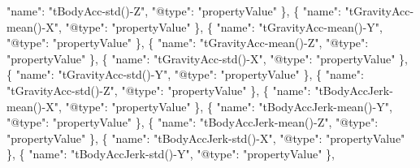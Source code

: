 \documentclass[
]{article}
\newenvironment{Shaded}{\begin{snugshade}}{\end{snugshade}}
\newcommand{\DataTypeTok}[1]{\textcolor[rgb]{0.13,0.29,0.53}{#1}}
\newcommand{\FunctionTok}[1]{\textcolor[rgb]{0.00,0.00,0.00}{#1}}
\newcommand{\OtherTok}[1]{\textcolor[rgb]{0.56,0.35,0.01}{#1}}
\newcommand{\StringTok}[1]{\textcolor[rgb]{0.31,0.60,0.02}{#1}}
\begin{document}
\begin{Shaded}
\begin{Highlighting}[]
      \DataTypeTok{"name"}\FunctionTok{:} \StringTok{"tBodyAcc{-}std(){-}Z"}\FunctionTok{,}
      \DataTypeTok{"@type"}\FunctionTok{:} \StringTok{"propertyValue"}
    \FunctionTok{\}}\OtherTok{,}
    \FunctionTok{\{}
      \DataTypeTok{"name"}\FunctionTok{:} \StringTok{"tGravityAcc{-}mean(){-}X"}\FunctionTok{,}
      \DataTypeTok{"@type"}\FunctionTok{:} \StringTok{"propertyValue"}
    \FunctionTok{\}}\OtherTok{,}
    \FunctionTok{\{}
      \DataTypeTok{"name"}\FunctionTok{:} \StringTok{"tGravityAcc{-}mean(){-}Y"}\FunctionTok{,}
      \DataTypeTok{"@type"}\FunctionTok{:} \StringTok{"propertyValue"}
    \FunctionTok{\}}\OtherTok{,}
    \FunctionTok{\{}
      \DataTypeTok{"name"}\FunctionTok{:} \StringTok{"tGravityAcc{-}mean(){-}Z"}\FunctionTok{,}
      \DataTypeTok{"@type"}\FunctionTok{:} \StringTok{"propertyValue"}
    \FunctionTok{\}}\OtherTok{,}
    \FunctionTok{\{}
      \DataTypeTok{"name"}\FunctionTok{:} \StringTok{"tGravityAcc{-}std(){-}X"}\FunctionTok{,}
      \DataTypeTok{"@type"}\FunctionTok{:} \StringTok{"propertyValue"}
    \FunctionTok{\}}\OtherTok{,}
    \FunctionTok{\{}
      \DataTypeTok{"name"}\FunctionTok{:} \StringTok{"tGravityAcc{-}std(){-}Y"}\FunctionTok{,}
      \DataTypeTok{"@type"}\FunctionTok{:} \StringTok{"propertyValue"}
    \FunctionTok{\}}\OtherTok{,}
    \FunctionTok{\{}
      \DataTypeTok{"name"}\FunctionTok{:} \StringTok{"tGravityAcc{-}std(){-}Z"}\FunctionTok{,}
      \DataTypeTok{"@type"}\FunctionTok{:} \StringTok{"propertyValue"}
    \FunctionTok{\}}\OtherTok{,}
    \FunctionTok{\{}
      \DataTypeTok{"name"}\FunctionTok{:} \StringTok{"tBodyAccJerk{-}mean(){-}X"}\FunctionTok{,}
      \DataTypeTok{"@type"}\FunctionTok{:} \StringTok{"propertyValue"}
    \FunctionTok{\}}\OtherTok{,}
    \FunctionTok{\{}
      \DataTypeTok{"name"}\FunctionTok{:} \StringTok{"tBodyAccJerk{-}mean(){-}Y"}\FunctionTok{,}
      \DataTypeTok{"@type"}\FunctionTok{:} \StringTok{"propertyValue"}
    \FunctionTok{\}}\OtherTok{,}
    \FunctionTok{\{}
      \DataTypeTok{"name"}\FunctionTok{:} \StringTok{"tBodyAccJerk{-}mean(){-}Z"}\FunctionTok{,}
      \DataTypeTok{"@type"}\FunctionTok{:} \StringTok{"propertyValue"}
    \FunctionTok{\}}\OtherTok{,}
    \FunctionTok{\{}
      \DataTypeTok{"name"}\FunctionTok{:} \StringTok{"tBodyAccJerk{-}std(){-}X"}\FunctionTok{,}
      \DataTypeTok{"@type"}\FunctionTok{:} \StringTok{"propertyValue"}
    \FunctionTok{\}}\OtherTok{,}
    \FunctionTok{\{}
      \DataTypeTok{"name"}\FunctionTok{:} \StringTok{"tBodyAccJerk{-}std(){-}Y"}\FunctionTok{,}
      \DataTypeTok{"@type"}\FunctionTok{:} \StringTok{"propertyValue"}
    \FunctionTok{\}}\OtherTok{,}

\end{Highlighting}
\end{Shaded}
\end{document}
